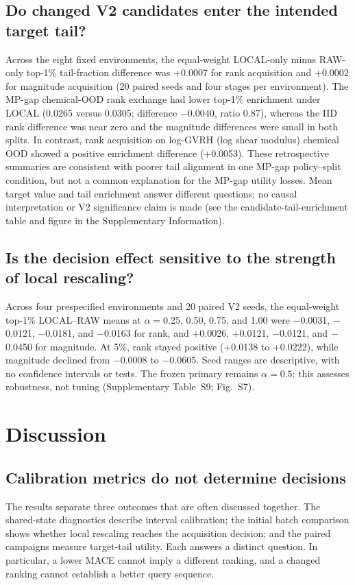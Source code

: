 \documentclass[11pt]{article}
\begin{document}
\subsection{Do changed V2 candidates enter the intended target tail?}
Across the eight fixed environments, the equal-weight LOCAL-only minus RAW-only top-1\% tail-fraction difference was +0.0007 for rank acquisition and +0.0002 for magnitude acquisition (20 paired seeds and four stages per environment). The MP-gap chemical-OOD rank exchange had lower top-1\% enrichment under LOCAL (0.0265 versus 0.0305; difference $-0.0040$, ratio 0.87), whereas the IID rank difference was near zero and the magnitude differences were small in both splits. In contrast, rank acquisition on log-GVRH (log shear modulus) chemical OOD showed a positive enrichment difference (+0.0053). These retrospective summaries are consistent with poorer tail alignment in one MP-gap policy--split condition, but not a common explanation for the MP-gap utility losses. Mean target value and tail enrichment answer different questions; no causal interpretation or V2 significance claim is made (see the candidate-tail-enrichment table and figure in the Supplementary Information).

\subsection{Is the decision effect sensitive to the strength of local rescaling?}
Across four prespecified environments and 20 paired V2 seeds, the equal-weight top-1\% LOCAL--RAW means at $\alpha=0.25$, 0.50, 0.75, and 1.00 were $-$0.0031, $-$0.0121, $-$0.0181, and $-$0.0163 for rank, and +0.0026, +0.0121, $-$0.0121, and $-$0.0450 for magnitude. At 5\%, rank stayed positive (+0.0138 to +0.0222), while magnitude declined from $-$0.0008 to $-$0.0605. Seed ranges are descriptive, with no confidence intervals or tests. The frozen primary remains $\alpha=0.5$; this assesses robustness, not tuning (Supplementary Table~S9; Fig.~S7).

\section{Discussion}
\subsection{Calibration metrics do not determine decisions}
The results separate three outcomes that are often discussed together. The shared-state diagnostics describe interval calibration; the initial batch comparison shows whether local rescaling reaches the acquisition decision; and the paired campaigns measure target-tail utility. Each answers a distinct question. In particular, a lower MACE cannot imply a different ranking, and a changed ranking cannot establish a better query sequence.
\end{document}
